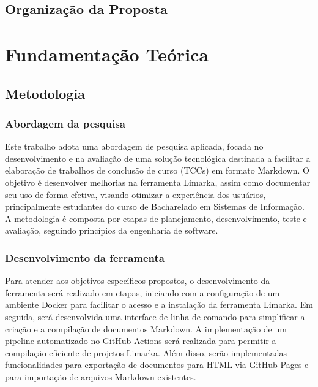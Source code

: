 \documentclass[
	12pt,				%
	oneside,			%
	a4paper,			%
	english,			%
	french,				%
	spanish,			%
	brazil				%
	]{abntex2}
\begin{document}
\hypertarget{organizauxe7uxe3o-da-proposta}{%
\section{Organização da Proposta}\label{organizauxe7uxe3o-da-proposta}}

\hypertarget{fundamentauxe7uxe3o-teuxf3rica}{%
\chapter{Fundamentação Teórica}\label{fundamentauxe7uxe3o-teuxf3rica}}

\hypertarget{metodologia}{%
\section{Metodologia}\label{metodologia}}

\hypertarget{abordagem-da-pesquisa}{%
\subsection{Abordagem da pesquisa}\label{abordagem-da-pesquisa}}

Este trabalho adota uma abordagem de pesquisa aplicada, focada no
desenvolvimento e na avaliação de uma solução tecnológica destinada a
facilitar a elaboração de trabalhos de conclusão de curso (TCCs) em
formato Markdown. O objetivo é desenvolver melhorias na ferramenta
Limarka, assim como documentar seu uso de forma efetiva, visando
otimizar a experiência dos usuários, principalmente estudantes do curso
de Bacharelado em Sistemas de Informação. A metodologia é composta por
etapas de planejamento, desenvolvimento, teste e avaliação, seguindo
princípios da engenharia de software.

\hypertarget{desenvolvimento-da-ferramenta}{%
\subsection{Desenvolvimento da
ferramenta}\label{desenvolvimento-da-ferramenta}}

Para atender aos objetivos específicos propostos, o desenvolvimento da
ferramenta será realizado em etapas, iniciando com a configuração de um
ambiente Docker para facilitar o acesso e a instalação da ferramenta
Limarka. Em seguida, será desenvolvida uma interface de linha de comando
para simplificar a criação e a compilação de documentos Markdown. A
implementação de um pipeline automatizado no GitHub Actions será
realizada para permitir a compilação eficiente de projetos Limarka. Além
disso, serão implementadas funcionalidades para exportação de documentos
para HTML via GitHub Pages e para importação de arquivos Markdown
existentes.
\end{document}
